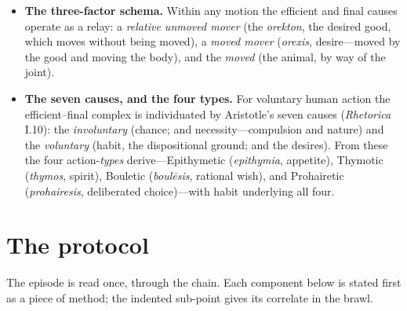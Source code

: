 \documentclass[11pt]{article}
\begin{document}
\begin{itemize}
\begin{itemize}
      \item \emph{The player's playing} (a \textit{praxis}): material $=$ the game-as-given (world, avatar, affordances); formal $=$ the form they know and complete (the avatar-form inhabited, the rules grasped as the shape of good play); efficient $=$ the player's own \textit{orexis}; final $=$ their own \textit{orekton}.
      \item \emph{The hinge}: one artifact, two angles---the designer's \emph{end-product} (the final cause of the \emph{making}) \emph{is} the player's \emph{given means} (the material and formal of the \emph{playing}). The designer therefore cannot be the efficient cause of the player's act---one agent cannot supply another's desire---but only authors the player's \emph{world} and \emph{anticipates} the player's end. ``Why now'' is the designer altering the player's material world to solicit a response; ``which way'' is the player's own efficient-and-final. Alignment of the two ends is a smooth design; the player's actual \textit{orekton} \emph{exceeding} the anticipated one is emergent play; its \emph{collapse} into the designed end, one face of compulsion.
    \end{itemize}
  \item \textbf{The three-factor schema.} Within any motion the efficient and final causes operate as a relay: a \emph{relative unmoved mover} (the \textit{orekton}, the desired good, which moves without being moved), a \emph{moved mover} (\textit{orexis}, desire---moved by the good and moving the body), and the \emph{moved} (the animal, by way of the joint).
  \item \textbf{The seven causes, and the four types.} For voluntary human action the efficient--final complex is individuated by Aristotle's seven causes (\emph{Rhetorica} I.10): the \emph{involuntary} (chance; and necessity---compulsion and nature) and the \emph{voluntary} (habit, the dispositional ground; and the desires). From these the four action-\emph{types} derive---Epithymetic (\textit{epithymia}, appetite), Thymotic (\textit{thymos}, spirit), Bouletic (\textit{boul\=esis}, rational wish), and Prohairetic (\textit{prohairesis}, deliberated choice)---with habit underlying all four.
\end{itemize}

\section{The protocol}
\noindent The episode is read once, through the chain. Each component below is stated first as a piece of method; the indented sub-point gives its correlate in the brawl.
\end{document}
